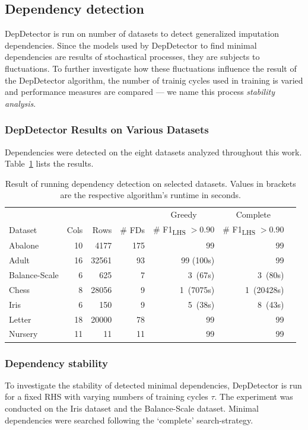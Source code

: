 \subsection{Dependency detection}
DepDetector is run on number of datasets to detect generalized imputation dependencies.
Since the models used by DepDetector to find minimal dependencies are results of stochastical processes, they are subjects to fluctuations.
To further investigate how these fluctuations influence the result of the DepDetector algorithm, the number of trainig cycles used in training is varied and performance measures are compared --- we name this process \emph{stability analysis}.

\subsubsection{DepDetector Results on Various Datasets}
Dependencies were detected on the eight datasets analyzed throughout this work.
Table~\ref{tab:dep-detector-performance} lists the results.

\begin{table}[ht]
    \centering
    \begin{tabular}{lrrrrrr}
        \toprule
        \toprule
        & & & & \multicolumn{1}{c}{Greedy} & \multicolumn{1}{c}{Complete} \\
        Dataset & Cols & Rows & \# FDs & \# F1\textsubscript{LHS} $> 0.90$ & \# F1\textsubscript{LHS} $> 0.90$ \\
        \midrule
        Abalone & 10 & 4177 & 175 & 99 & 99 \\
        Adult & 16 & 32561 & 93 & 99 (100s)& 99 \\
        Balance-Scale & 6 & 625 & 7 & 3~(67s) & 3~(80s) \\
        Chess & 8 & 28056 & 9 & 1~(7075s) & 1~(20428s) \\
        Iris & 6 & 150 & 9 & 5~(38s) & 8~(43s) \\
        Letter & 18 & 20000 & 78 & 99 & 99 \\
        Nursery & 11 & 11 & 11 & 99 & 99 \\
        \bottomrule
        \bottomrule
    \end{tabular}
    \caption{Result of running dependency detection on selected datasets. Values in brackets are the respective algorithm's runtime in seconds.}\label{tab:dep-detector-performance}
\end{table}

\subsubsection{Dependency stability}
To investigate the stability of detected minimal dependencies, DepDetector is run for a fixed RHS with varying numbers of training cycles \( \tau \).
The experiment was conducted on the Iris dataset and the Balance-Scale dataset.
Minimal dependencies were searched following the `complete' search-strategy.

